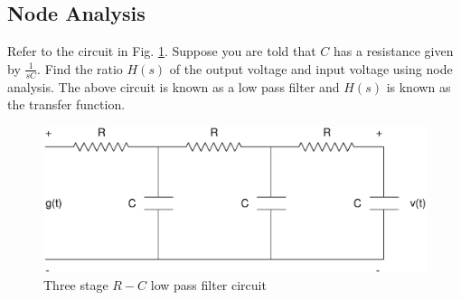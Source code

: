 
\subsection{Node Analysis}
%
\begin{problem}
Refer to the circuit in Fig. \ref{fig:2.1}. Suppose you are told that $C$ has a resistance given by $\frac{1}{s  C}$.   Find the ratio $H(s)$ of the output voltage and input voltage using node analysis.  The above circuit is known as a low pass filter and $H(s)$ is known as the transfer function.
\end{problem}
%
%
\begin{figure}[!h]
\centering
\includegraphics[width=\columnwidth]{./chapter2/figs/2.1.eps}
\caption{Three stage $R-C$ low pass filter circuit}
\label{fig:2.1}
\end{figure}
%

